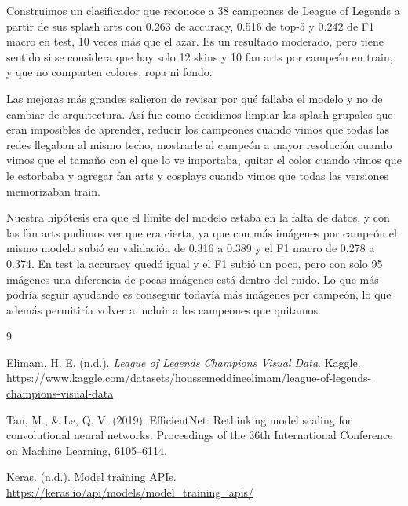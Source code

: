 \documentclass[10pt,twocolumn]{article}
\begin{document}
Construimos un clasificador que reconoce a 38 campeones de League of Legends a partir de sus splash arts con 0.263 de accuracy, 0.516 de top-5 y 0.242 de F1 macro en test, 10 veces más que el azar. Es un resultado moderado, pero tiene sentido si se considera que hay solo 12 skins y 10 fan arts por campeón en train, y que no comparten colores, ropa ni fondo.

Las mejoras más grandes salieron de revisar por qué fallaba el modelo y no de cambiar de arquitectura. Así fue como decidimos limpiar las splash grupales que eran imposibles de aprender, reducir los campeones cuando vimos que todas las redes llegaban al mismo techo, mostrarle al campeón a mayor resolución cuando vimos que el tamaño con el que lo ve importaba, quitar el color cuando vimos que le estorbaba y agregar fan arts y cosplays cuando vimos que todas las versiones memorizaban train.

Nuestra hipótesis era que el límite del modelo estaba en la falta de datos, y con las fan arts pudimos ver que era cierta, ya que con más imágenes por campeón el mismo modelo subió en validación de 0.316 a 0.389 y el F1 macro de 0.278 a 0.374. En test la accuracy quedó igual y el F1 subió un poco, pero con solo 95 imágenes una diferencia de pocas imágenes está dentro del ruido. Lo que más podría seguir ayudando es conseguir todavía más imágenes por campeón, lo que además permitiría volver a incluir a los campeones que quitamos.

\begin{thebibliography}{9}
\small

Elimam, H. E. (n.d.). \textit{League of Legends Champions Visual Data}. Kaggle. \url{https://www.kaggle.com/datasets/houssemeddineelimam/league-of-legends-champions-visual-data}

Tan, M., \& Le, Q. V. (2019). EfficientNet: Rethinking model scaling for convolutional neural networks. Proceedings of the 36th International Conference on Machine Learning, 6105--6114.

Keras. (n.d.). Model training APIs. \url{https://keras.io/api/models/model_training_apis/}

\end{thebibliography}
\end{document}
